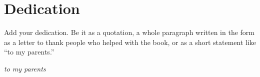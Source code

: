 
\thispagestyle{empty}

\chapter{Dedication}

Add your dedication. Be it as a quotation, a whole paragraph written in the form as a letter to thank people who helped with the book, or as a short statement like ``to my parents.''

\textit{to my parents}